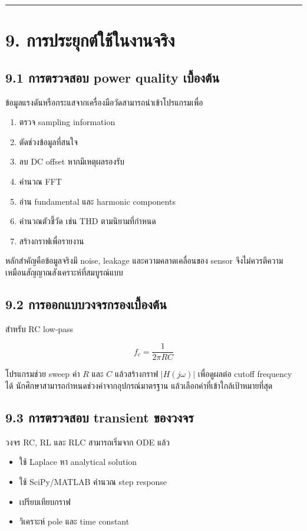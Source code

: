 \par\noindent\rule{\textwidth}{0.4pt}\par

\section{9. การประยุกต์ใช้ในงานจริง}

\subsection{9.1 การตรวจสอบ power quality เบื้องต้น}

ข้อมูลแรงดันหรือกระแสจากเครื่องมือวัดสามารถนำเข้าโปรแกรมเพื่อ

\begin{enumerate}
    \item ตรวจ sampling information
    \item ตัดช่วงข้อมูลที่สนใจ
    \item ลบ DC offset หากมีเหตุผลรองรับ
    \item คำนวณ FFT
    \item อ่าน fundamental และ harmonic components
    \item คำนวณตัวชี้วัด เช่น THD ตามนิยามที่กำหนด
    \item สร้างกราฟเพื่อรายงาน
\end{enumerate}

หลักสำคัญคือข้อมูลจริงมี noise, leakage และความคลาดเคลื่อนของ sensor จึงไม่ควรตีความเหมือนสัญญาณสังเคราะห์ที่สมบูรณ์แบบ

\subsection{9.2 การออกแบบวงจรกรองเบื้องต้น}

สำหรับ RC low-pass

\[
f_c=\frac{1}{2\pi RC}
\]

โปรแกรมช่วย sweep ค่า $R$ และ $C$ แล้วสร้างกราฟ $|H(j\omega)|$ เพื่อดูผลต่อ cutoff frequency ได้ นักศึกษาสามารถกำหนดช่วงค่าจากอุปกรณ์มาตรฐาน แล้วเลือกค่าที่เข้าใกล้เป้าหมายที่สุด

\subsection{9.3 การตรวจสอบ transient ของวงจร}

วงจร RC, RL และ RLC สามารถเริ่มจาก ODE แล้ว

\begin{itemize}
    \item ใช้ Laplace หา analytical solution
    \item ใช้ SciPy/MATLAB คำนวณ step response
    \item เปรียบเทียบกราฟ
    \item วิเคราะห์ pole และ time constant
\end{itemize}

